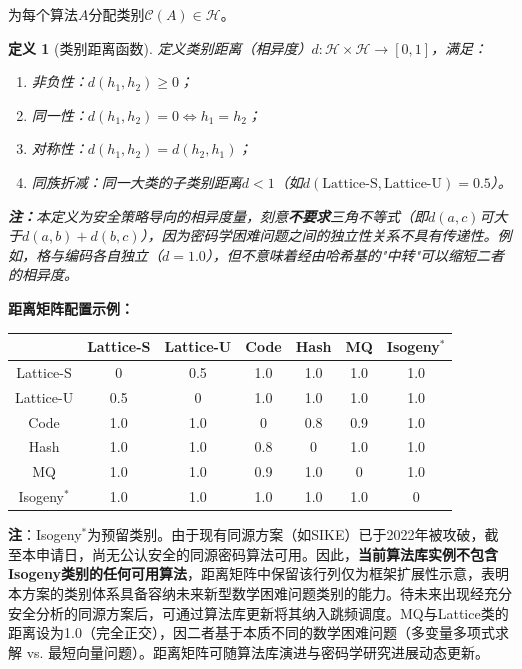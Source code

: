 ﻿\documentclass[12pt,a4paper]{article}
\newtheorem{definition}{定义}
\begin{document}
为每个算法$A$分配类别$\mathcal{C}(A) \in \mathcal{H}$。

\begin{definition}[类别距离函数]
定义类别距离（相异度）$d: \mathcal{H} \times \mathcal{H} \to [0, 1]$，满足：
\begin{enumerate}[label=(\roman*)]
    \item 非负性：$d(h_1, h_2) \geq 0$；
    \item 同一性：$d(h_1, h_2) = 0 \iff h_1 = h_2$；
    \item 对称性：$d(h_1, h_2) = d(h_2, h_1)$；
    \item 同族折减：同一大类的子类别距离$d < 1$（如$d(\text{Lattice-S}, \text{Lattice-U}) = 0.5$）。
\end{enumerate}
{\normalfont\textbf{注：}}本定义为安全策略导向的相异度量，刻意{\normalfont\textbf{不要求}}三角不等式（即$d(a,c)$可大于$d(a,b)+d(b,c)$），因为密码学困难问题之间的独立性关系不具有传递性。例如，格与编码各自独立（$d=1.0$），但不意味着经由哈希基的"中转"可以缩短二者的相异度。
\end{definition}

\textbf{距离矩阵配置示例：}

\begin{center}
\begin{tabular}{|c|c|c|c|c|c|c|}
\hline
 & Lattice-S & Lattice-U & Code & Hash & MQ & Isogeny$^*$ \\
\hline
Lattice-S & 0 & 0.5 & 1.0 & 1.0 & 1.0 & 1.0 \\
\hline
Lattice-U & 0.5 & 0 & 1.0 & 1.0 & 1.0 & 1.0 \\
\hline
Code & 1.0 & 1.0 & 0 & 0.8 & 0.9 & 1.0 \\
\hline
Hash & 1.0 & 1.0 & 0.8 & 0 & 1.0 & 1.0 \\
\hline
MQ & 1.0 & 1.0 & 0.9 & 1.0 & 0 & 1.0 \\
\hline
Isogeny$^*$ & 1.0 & 1.0 & 1.0 & 1.0 & 1.0 & 0 \\
\hline
\end{tabular}
\end{center}

\textbf{注}：Isogeny$^*$为预留类别。由于现有同源方案（如SIKE）已于2022年被攻破，截至本申请日，尚无公认安全的同源密码算法可用。因此，\textbf{当前算法库实例不包含Isogeny类别的任何可用算法}，距离矩阵中保留该行列仅为框架扩展性示意，表明本方案的类别体系具备容纳未来新型数学困难问题类别的能力。待未来出现经充分安全分析的同源方案后，可通过算法库更新将其纳入跳频调度。MQ与Lattice类的距离设为1.0（完全正交），因二者基于本质不同的数学困难问题（多变量多项式求解 vs. 最短向量问题）。距离矩阵可随算法库演进与密码学研究进展动态更新。
\end{document}
